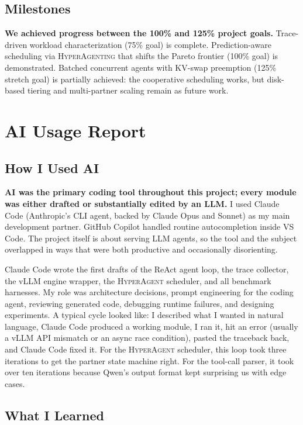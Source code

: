 \documentclass[10pt,twocolumn]{article}
\begin{document}
\subsection{Milestones}

\textbf{We achieved progress between the 100\% and 125\% project goals.} Trace-driven workload characterization (75\% goal) is complete. Prediction-aware scheduling via \textsc{HyperAgenting} that shifts the Pareto frontier (100\% goal) is demonstrated. Batched concurrent agents with KV-swap preemption (125\% stretch goal) is partially achieved: the cooperative scheduling works, but disk-based tiering and multi-partner scaling remain as future work.

\section{AI Usage Report}

\subsection{How I Used AI}

\textbf{AI was the primary coding tool throughout this project; every module was either drafted or substantially edited by an LLM.} I used Claude Code (Anthropic's CLI agent, backed by Claude Opus and Sonnet) as my main development partner. GitHub Copilot handled routine autocompletion inside VS Code. The project itself is about serving LLM agents, so the tool and the subject overlapped in ways that were both productive and occasionally disorienting.

Claude Code wrote the first drafts of the ReAct agent loop, the trace collector, the vLLM engine wrapper, the \textsc{HyperAgent} scheduler, and all benchmark harnesses. My role was architecture decisions, prompt engineering for the coding agent, reviewing generated code, debugging runtime failures, and designing experiments. A typical cycle looked like: I described what I wanted in natural language, Claude Code produced a working module, I ran it, hit an error (usually a vLLM API mismatch or an async race condition), pasted the traceback back, and Claude Code fixed it. For the \textsc{HyperAgent} scheduler, this loop took three iterations to get the partner state machine right. For the tool-call parser, it took over ten iterations because Qwen's output format kept surprising us with edge cases.

\subsection{What I Learned}
\end{document}

